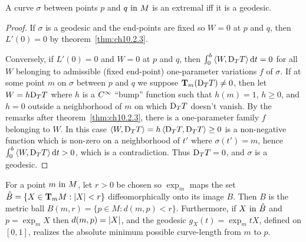\documentclass[../main]{subfiles}
\begin{document}
\begin{theorem} \label{thm:ch10.2.4}
    A curve $\sigma$ between points $p$ and $q \InText M$ is an extremal iff it is a geodesic.
\end{theorem}

\begin{proof}
    If $\sigma$ is a geodesic and the end-points are fixed so $W = 0$ at $p$ and $q$, then $L'(0) = 0$ by theorem~\ref{thm:ch10.2.3}.

    Conversely, if $L'(0) = 0$ and $W = 0$ at $p$ and $q$, then $\int_0^b \ip{W}{\connection_T T} \dd{t} = 0$ for all $W$ belonging to admissible (fixed end-point) one-parameter variations $f$ of $\sigma$. If at some point $m$ on $\sigma$ between $p$ and $q$ we suppose $\tangentspace{(\connection_T T)}{m} \ne 0$, then let $W = h\connection_T T$ where $h$ is a $\CInfty$ ``bump'' function such that $h(m) = 1$, $h \geq 0$, and $h = 0$ outside a neighborhood of $m$ on which $\connection_T T$ doesn't vanish. By the remarks after theorem~\ref{thm:ch10.2.3}, there is a one-parameter family $f$ belonging to $W$. In this case $\ip{W}{\connection_T T} = h\ip{\connection_T T}{\connection_T T} \geq 0$ is a non-negative function which is non-zero on a neighborhood of $t'$ where $\sigma(t') = m$, hence $\int_0^b \ip{W}{\connection_T T} \dd{t} > 0$, which is a contradiction. Thus $\connection_T T = 0$, and $\sigma$ is a geodesic.
\end{proof}



\begin{theorem} \label{thm:ch10.2.5}
    For a point $m \InText M$, let $r > 0$ be chosen so $\exp_m$ maps the set $\hat{B} = \{X \in \tangentspace{M}{m} : \norm{X} < r\}$ diffeomorphically onto its image $B$. Then $B$ is the metric ball $B(m, r) = \{p \in M : d(m, p) < r\}$. Furthermore, if $X \InText \hat{B}$ and $p = \exp_m X$ then $d(m, p) = \norm{X}$, and the geodesic $g_X(t) = \exp_m tX$, defined on $[0,1]$, realizes the absolute minimum possible curve-length from $m$ to $p$.
\end{theorem}
\end{document}
